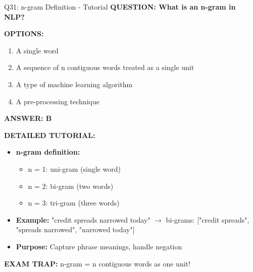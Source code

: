 \documentclass[8pt]{beamer}
\begin{document}
	\begin{frame}{Q31: n-gram Definition - Tutorial}
		\fontsize{6.5}{7.5}\selectfont
		\textbf{QUESTION: What is an n-gram in NLP?}
		
		\vspace{0.1cm}
		\textbf{OPTIONS:}
		\begin{enumerate}
			\item A single word
			\item A sequence of n contiguous words treated as a single unit
			\item A type of machine learning algorithm
			\item A pre-processing technique
		\end{enumerate}
		
		\vspace{0.1cm}
		\textcolor{myblue}{\textbf{ANSWER: B}}
		
		\vspace{0.1cm}
		\textbf{DETAILED TUTORIAL:}
		\begin{itemize}
			\item \textbf{n-gram definition:}
			\begin{itemize}
				\item n = 1: uni-gram (single word)
				\item n = 2: bi-gram (two words)
				\item n = 3: tri-gram (three words)
			\end{itemize}
			\item \textbf{Example:} "credit spreads narrowed today" $\to$ bi-grams: ["credit spreads", "spreads narrowed", "narrowed today"]
			\item \textbf{Purpose:} Capture phrase meanings, handle negation
		\end{itemize}
		
		\textcolor{myred}{\textbf{EXAM TRAP:}} n-gram = \textcolor{myblue}{n contiguous words as one unit}!
	\end{frame}
	
\end{document}
